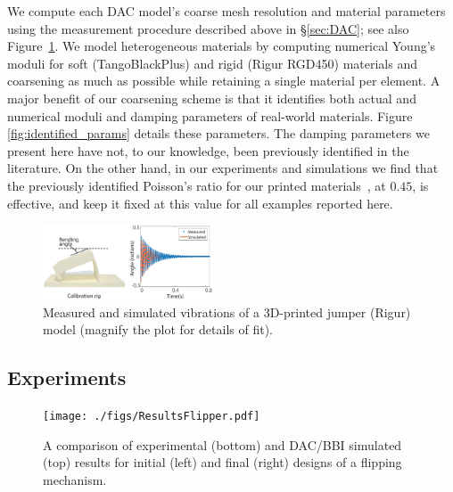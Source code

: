 We compute each DAC model's coarse mesh resolution and material parameters using the measurement procedure described above in \S\ref{sec:DAC}; see also Figure~\ref{fig:vibration_match}. We model heterogeneous materials by computing numerical Young's moduli for soft (TangoBlackPlus) and rigid (Rigur RGD450) materials and coarsening as much as possible while retaining a single material per element. A major benefit of our coarsening scheme is that it identifies both actual and numerical moduli and damping parameters of real-world materials. Figure \ref{fig:identified_params} details these parameters. The damping parameters we present here have not, to our knowledge, been previously identified in the literature. On the other hand, in our experiments and simulations we find that the previously identified Poisson's ratio for our printed materials~\cite{major2011}, at $0.45$, is effective, and keep it fixed at this value for all examples reported here.

\begin{figure}
\includegraphics[width=0.45\textwidth]{figs/measure.pdf}
\caption{Measured and simulated vibrations of a 3D-printed jumper (Rigur) model (magnify the plot for details of fit).}
\label{fig:vibration_match}
\end{figure}

\subsection{Experiments}
\label{sec:exp}


\begin{figure}[h!]
\texttt{[image: ./figs/ResultsFlipper.pdf]}
\caption{A comparison of experimental (bottom) and DAC/BBI simulated (top) results for initial (left) and final (right) designs of a flipping mechanism.}
\label{fig:flipper}	
\end{figure}

